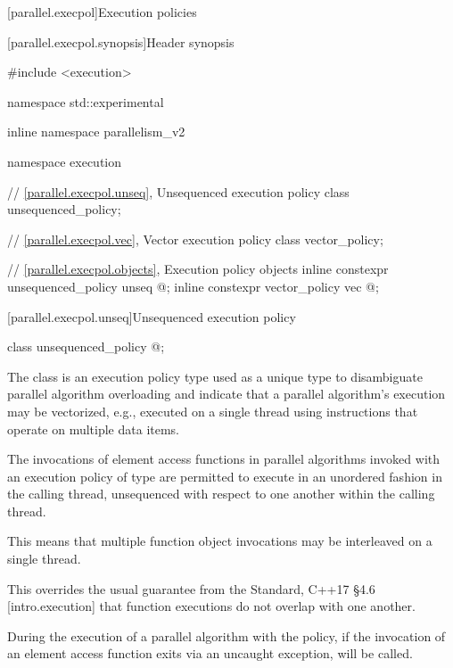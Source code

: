 
[parallel.execpol]{Execution policies}

[parallel.execpol.synopsis]{Header  synopsis}

\begin{codeblock}
#include <execution>

namespace std::experimental {
inline namespace parallelism_v2 {
namespace execution {
  // \ref{parallel.execpol.unseq}, Unsequenced execution policy
  class unsequenced_policy;

  // \ref{parallel.execpol.vec}, Vector execution policy
  class vector_policy;

  // \ref{parallel.execpol.objects}, Execution policy objects
  inline constexpr unsequenced_policy unseq{ @\unspec@ };
  inline constexpr vector_policy vec{ @\unspec@ };
}
}
}
\end{codeblock}

[parallel.execpol.unseq]{Unsequenced execution policy}

\begin{itemdecl}
class unsequenced_policy{ @\unspec@ };
\end{itemdecl}

\pnum
The class  is an execution policy type used as
a unique type to disambiguate parallel algorithm overloading and indicate that
a parallel algorithm's execution may be vectorized, e.g., executed on a single
thread using instructions that operate on multiple data items.

\pnum
The invocations of element access functions in parallel algorithms
invoked with an execution policy of type  are
permitted to execute in an unordered fashion in the calling thread, unsequenced
with respect to one another within the calling thread. \begin{note}This means
that multiple function object invocations may be interleaved on a single
thread.\end{note}

\pnum
\begin{note}This overrides the usual guarantee from the \Cpp Standard, C++17 \S4.6 [intro.execution] that function executions do not overlap with one another.\end{note}

\pnum
During the execution of a parallel algorithm with the  policy, if the invocation of an element access function exits via an uncaught exception,  will be called.

